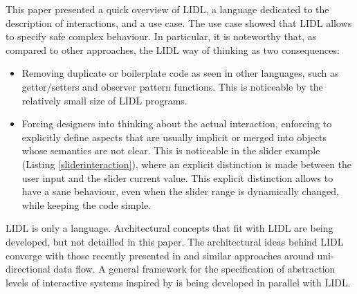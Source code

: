\documentclass[10pt]{sigplanconf}
\begin{document}
This paper presented a quick overview of LIDL, a language dedicated to the description of interactions, and a use case. The use case showed that LIDL allows to specify safe complex behaviour. In particular, it is noteworthy that, as compared to other approaches, the LIDL way of thinking as two consequences: 
\begin{itemize}
  \item Removing duplicate or boilerplate code as seen in other languages, such as getter/setters and observer pattern functions. This is noticeable by the relatively small size of LIDL programs.
  \item Forcing designers into thinking about the actual interaction, enforcing to explicitly define aspects that are usually implicit or merged into objects whose semantics are not clear. This is noticeable in the slider example (Listing \ref{sliderinteraction}), where an explicit distinction is made between the user input and the slider current value. This explicit distinction allows to have a sane behaviour, even when the slider range is dynamically changed, while keeping the code simple.
\end{itemize} 

 LIDL is only a language. Architectural concepts that fit with LIDL are being developed, but not detailled in this paper. The architectural ideas behind LIDL converge with those recently presented in \cite{facebook-react} and similar approaches around uni-directional data flow. A general framework for the specification of abstraction levels of interactive systems inspired by \cite{Zave:2012:GVN:2405178.2405179} is being developed in parallel with LIDL.


%
%
%






\end{document}
